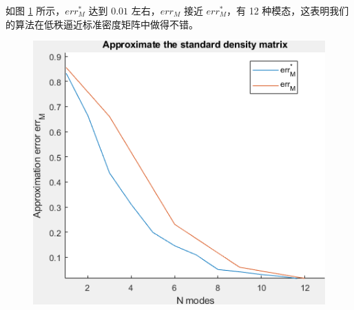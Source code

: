 \documentclass[12pt]{article}
\begin{document}
如图 \ref{fig:approx error} 所示，$err_M^*$ 达到 $0.01$ 左右，$err_M$ 接近 $err_M^*$，有 12 种模态，这表明我们的算法在低秩逼近标准密度矩阵中做得不错。

\begin{figure}[H]
	\centering
	\includegraphics[width=0.8\linewidth]{../figures/approximation.png}
	\caption{}
	
	\label{fig:approx error}
	
\end{figure}
\end{document}
